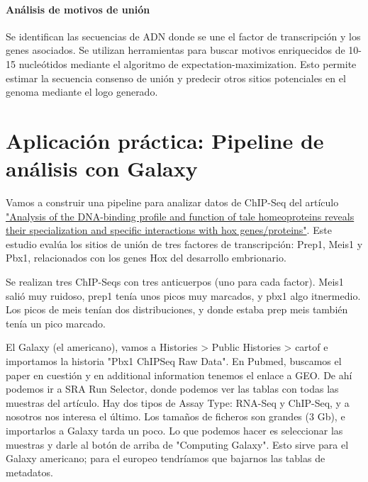 \paragraph{Análisis de motivos de unión}
Se identifican las secuencias de ADN donde se une el factor de transcripción y los genes asociados.
Se utilizan herramientas para buscar motivos enriquecidos de 10-15 nucleótidos mediante el algoritmo de expectation-maximization.
Esto permite estimar la secuencia consenso de unión y predecir otros sitios potenciales en el genoma mediante el logo generado.

\section{Aplicación práctica: Pipeline de análisis con Galaxy}
Vamos a construir una pipeline para analizar datos de ChIP-Seq del artículo \href{https://www.sciencedirect.com/science/article/pii/S2211124713001368?via\%3Dihub}{"Analysis of the DNA-binding profile and function of tale homeoproteins reveals their specialization and specific interactions with hox genes/proteins"}. Este estudio evalúa los sitios de unión de tres factores de transcripción: Prep1, Meis1 y Pbx1, relacionados con los genes Hox del desarrollo embrionario.



Se realizan tres ChIP-Seqs con tres anticuerpos (uno para cada factor). Meis1 salió muy ruidoso, prep1 tenía unos picos muy marcados, y pbx1 algo itnermedio. Los picos de meis tenían dos distribuciones, y donde estaba prep meis también tenía un pico marcado. 

El Galaxy (el americano), vamos a Histories > Public Histories > cartof e importamos la historia "Pbx1 ChIPSeq Raw Data". En Pubmed, buscamos el paper en cuestión y en additional information tenemos el enlace a GEO. De ahí podemos ir a SRA Run Selector, donde podemos ver las tablas con todas las muestras del artículo. Hay dos tipos de Assay Type: RNA-Seq y ChIP-Seq, y a nosotros nos interesa el último. Los tamaños de ficheros son grandes (3 Gb), e importarlos a Galaxy tarda un poco. Lo que podemos hacer es seleccionar las muestras y darle al botón de arriba de "Computing Galaxy". Esto sirve para el Galaxy americano; para el europeo tendríamos que bajarnos las tablas de metadatos. 

